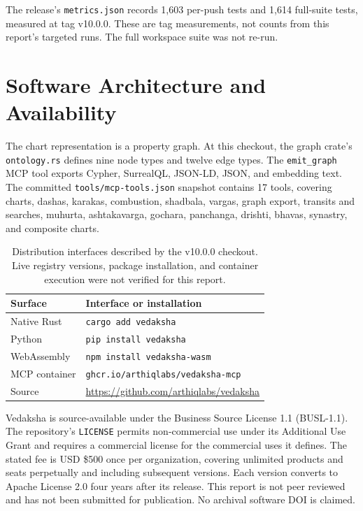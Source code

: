 \documentclass[11pt]{article}
\begin{document}
The release's \texttt{metrics.json} records 1,603 per-push tests and 1,614 full-suite
tests, measured at tag v10.0.0. These are tag measurements, not counts from this
report's targeted runs. The full workspace suite was not re-run.

\section{Software Architecture and Availability}

The chart representation is a property graph. At this checkout,
the graph crate's \texttt{ontology.rs} defines nine node types and twelve
edge types. The \texttt{emit\_graph} MCP tool exports Cypher, SurrealQL, JSON-LD,
JSON, and embedding text. The committed \texttt{tools/mcp-tools.json} snapshot
contains 17 tools, covering charts, dashas, karakas, combustion, shadbala, vargas,
graph export, transits and searches, muhurta, ashtakavarga, gochara, panchanga,
drishti, bhavas, synastry, and composite charts.

\begin{table}[!htbp]
\centering
\small
\begin{tabular}{@{}lp{8.8cm}@{}}
\toprule
Surface & Interface or installation \\
\midrule
Native Rust & \texttt{cargo add vedaksha} \\
Python & \texttt{pip install vedaksha} \\
WebAssembly & \texttt{npm install vedaksha-wasm} \\
MCP container & \texttt{ghcr.io/arthiqlabs/vedaksha-mcp} \\
Source & \url{https://github.com/arthiqlabs/vedaksha} \\
\bottomrule
\end{tabular}
\caption{Distribution interfaces described by the v10.0.0 checkout.
Live registry versions, package installation, and container execution were not verified
for this report.}
\end{table}

Vedaksha is source-available under the Business Source License 1.1 (BUSL-1.1).
The repository's \texttt{LICENSE} permits non-commercial use under its Additional
Use Grant and requires a commercial license for the commercial uses it defines.
The stated fee is USD \$500 once per organization, covering unlimited products and
seats perpetually and including subsequent versions. Each version converts to
Apache License 2.0 four years after its release.
This report is not peer reviewed and has not been submitted for publication.
No archival software DOI is claimed.
\end{document}

